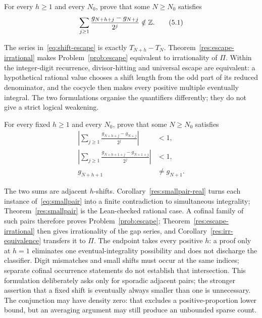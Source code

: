 \documentclass[11pt]{article}
\begin{document}
\begin{problem}\label{prob:escape}
For every $h\ge1$ and every $N_0$, prove that some $N\ge N_0$ satisfies
\[
 \sum_{j\ge1}
 \frac{g_{N+h+j}-g_{N+j}}{2^j}\notin\mathbb{Z} .
\tag{5.1}\label{eq:shift-escape}
\]
\end{problem}

The series in~\eqref{eq:shift-escape} is exactly $T_{N+h}-T_N$.  Theorem~\ref{res:escape-irrational} makes
Problem~\ref{prob:escape} equivalent to irrationality of $\Pi$.  Within the
integer-digit recurrence, divisor-hitting and universal escape are equivalent:
a hypothetical rational value chooses a shift length from the odd part of its
reduced denominator, and the cocycle then makes every positive multiple
eventually integral.  The two formulations organise the quantifiers
differently; they do not give a strict logical weakening.

\begin{problem}\label{prob:smallpair}
For every fixed $h\ge1$ and every $N_0$, prove that some $N\ge N_0$ satisfies
\[
\begin{split}
\left|\sum_{j\ge1}
 \frac{g_{N+h+j}-g_{N+j}}{2^j}\right|&<1,\\
\left|\sum_{j\ge1}
 \frac{g_{N+h+1+j}-g_{N+1+j}}{2^j}\right|&<1,\\
g_{N+h+1}&\ne g_{N+1}.
\end{split}
\tag{5.2}\label{eq:smallpair}
\]
\end{problem}

The two sums are adjacent $h$-shifts.  Corollary~\ref{res:smallpair-real} turns
each instance of~\eqref{eq:smallpair} into a finite contradiction to
simultaneous integrality; Theorem~\ref{res:smallpair} is the Lean-checked
rational case.  A cofinal family of such pairs therefore proves
Problem~\ref{prob:escape}; Theorem~\ref{res:escape-irrational} then gives irrationality
of the gap series, and Corollary~\ref{res:irr-equivalence} transfers it to
$\Pi$.  The endpoint takes every positive $h$: a proof only at $h=1$
eliminates one eventual-integrality possibility and does not discharge the
classifier.  Digit mismatches and small shifts must occur at the same indices;
separate cofinal occurrence statements do not establish that intersection.
This formulation deliberately asks only for sporadic adjacent pairs;
the stronger assertion that a fixed shift is eventually always smaller than
one is unnecessary.  The conjunction may have density zero: that excludes a
positive-proportion lower bound, but an averaging argument may still produce
an unbounded sparse count.
\end{document}
